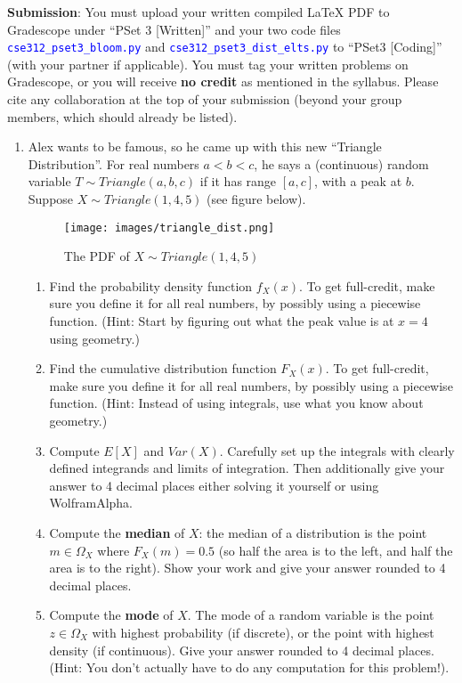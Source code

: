 \documentclass[12pt]{article}
\def\code#1{\textcolor{blue}{\texttt{#1}}}
\renewcommand{\|}{\mid}
\begin{document}
\textbf{Submission}: You must upload your written compiled LaTeX PDF to Gradescope under ``PSet 3 [Written]'' and your two code files \code{cse312\_pset3\_bloom.py} and \code{cse312\_pset3\_dist\_elts.py}  to ``PSet3 [Coding]'' (with your partner if applicable).  You must tag your written problems on Gradescope, or you will receive \textbf{no credit} as mentioned in the syllabus. Please cite any collaboration at the top of your submission (beyond your group members, which should already be listed).

\begin{enumerate}

\item Alex wants to be famous, so he came up with this new ``Triangle Distribution''. For real numbers $a<b<c$, he says a (continuous) random variable $T\sim Triangle(a,b,c)$ if it has range $[a,c]$, with a peak at $b$. Suppose $X\sim Triangle(1,4,5)$ (see figure below).
\begin{figure}[h]
\caption{The PDF of $X\sim Triangle(1,4,5)$}
\centering
\texttt{[image: images/triangle\_dist.png]}
\end{figure}
\begin{enumerate}
    \item Find the probability density function $f_X(x)$. To get full-credit, make sure you define it for all real numbers, by possibly using a piecewise function. (Hint: Start by figuring out what the peak value is at $x=4$ using geometry.)
    \item Find the cumulative distribution function $F_X(x)$. To get full-credit, make sure you define it for all real numbers, by possibly using a piecewise function. (Hint: Instead of using integrals, use what you know about geometry.)
    \item Compute $E[X]$ and $Var(X)$. Carefully set up the integrals with clearly defined integrands and limits of integration. Then additionally give your answer to 4 decimal places either solving it yourself or using WolframAlpha.
    \item Compute the \textbf{median} of $X$: the median of a distribution is the point $m\in\Omega_X$ where $F_X(m)=0.5$ (so half the area is to the left, and half the area is to the right). Show your work and give your answer rounded to 4 decimal places.
    \item Compute the \textbf{mode} of $X$. The mode of a random variable is the point $z\in\Omega_X$ with highest probability (if discrete), or the point with highest density (if continuous). Give your answer rounded to 4 decimal places. (Hint: You don't actually have to do any computation for this problem!).
\end{enumerate}


\end{enumerate}
\end{document}
